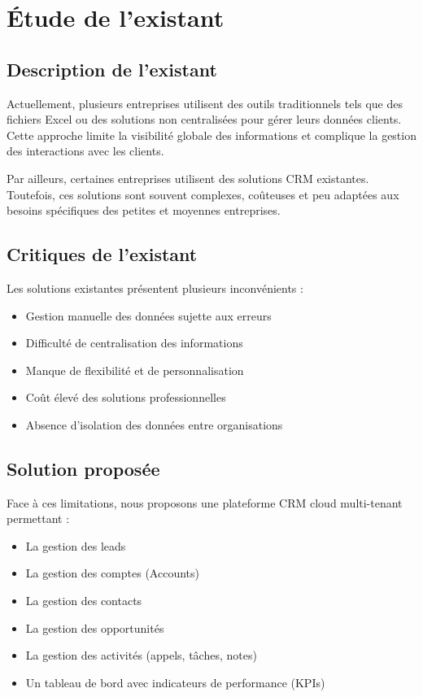 \documentclass[12pt,a4paper,twoside,openany]{book}
\begin{document}
\section{Étude de l’existant}

\subsection{Description de l’existant}

Actuellement, plusieurs entreprises utilisent des outils traditionnels tels que des fichiers Excel ou des solutions non centralisées pour gérer leurs données clients. Cette approche limite la visibilité globale des informations et complique la gestion des interactions avec les clients.

Par ailleurs, certaines entreprises utilisent des solutions CRM existantes. Toutefois, ces solutions sont souvent complexes, coûteuses et peu adaptées aux besoins spécifiques des petites et moyennes entreprises.

\subsection{Critiques de l’existant}

Les solutions existantes présentent plusieurs inconvénients :

\begin{itemize}
\item Gestion manuelle des données sujette aux erreurs
\item Difficulté de centralisation des informations
\item Manque de flexibilité et de personnalisation
\item Coût élevé des solutions professionnelles
\item Absence d’isolation des données entre organisations
\end{itemize}

\subsection{Solution proposée}

Face à ces limitations, nous proposons une plateforme CRM cloud multi-tenant permettant :

\begin{itemize}
\item La gestion des leads
\item La gestion des comptes (Accounts)
\item La gestion des contacts
\item La gestion des opportunités
\item La gestion des activités (appels, tâches, notes)
\item Un tableau de bord avec indicateurs de performance (KPIs)
\end{itemize}
\end{document}
